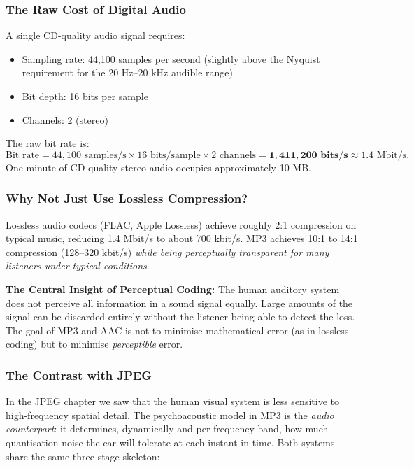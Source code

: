 \subsubsection{The Raw Cost of Digital Audio}

A single CD-quality audio signal requires:
\begin{itemize}[nosep]
    \item Sampling rate: 44,100 samples per second (slightly above the Nyquist requirement for the 20 Hz--20 kHz audible range)
    \item Bit depth: 16 bits per sample
    \item Channels: 2 (stereo)
\end{itemize}
The raw bit rate is:
\[
\text{Bit rate} = 44{,}100 \text{ samples/s} \times 16 \text{ bits/sample} \times 2 \text{ channels} = \mathbf{1{,}411{,}200 \text{ bits/s}} \approx 1.4\text{ Mbit/s}.
\]
One minute of CD-quality stereo audio occupies approximately 10 MB.

\subsubsection{Why Not Just Use Lossless Compression?}

Lossless audio codecs (FLAC, Apple Lossless) achieve roughly 2:1 compression on typical music, reducing 1.4 Mbit/s to about 700 kbit/s. MP3 achieves 10:1 to 14:1 compression (128--320 kbit/s) \emph{while being perceptually transparent for many listeners under typical conditions}.

\begin{importantbox}
\textbf{The Central Insight of Perceptual Coding:}
The human auditory system does not perceive all information in a sound signal equally. Large amounts of the signal can be discarded entirely without the listener being able to detect the loss. The goal of MP3 and AAC is not to minimise mathematical error (as in lossless coding) but to minimise \emph{perceptible} error.
\end{importantbox}

\subsubsection{The Contrast with JPEG}

In the JPEG chapter we saw that the human visual system is less sensitive to high-frequency spatial detail. The psychoacoustic model in MP3 is the \emph{audio counterpart}: it determines, dynamically and per-frequency-band, how much quantisation noise the ear will tolerate at each instant in time. Both systems share the same three-stage skeleton:

